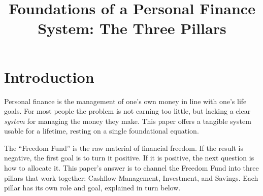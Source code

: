 \documentclass[10pt,a4paper,twocolumn]{article}
\title{\vspace{-1.5em}\bfseries\color{accent}\Large Foundations of a Personal Finance System: The Three Pillars}
\author{}
\date{}
\begin{document}

\section{Introduction}
Personal finance is the management of one's own money in line with one's life goals. For most people the problem is not earning too little, but lacking a clear \textit{system} for managing the money they make. This paper offers a tangible system usable for a lifetime, resting on a single foundational equation.

\begin{center}
{\setlength{\fboxsep}{10pt}}
\end{center}

The ``Freedom Fund'' is the raw material of financial freedom. If the result is negative, the first goal is to turn it positive. If it is positive, the next question is how to allocate it. This paper's answer is to channel the Freedom Fund into three pillars that work together: Cashflow Management, Investment, and Savings. Each pillar has its own role and goal, explained in turn below.
\end{document}
